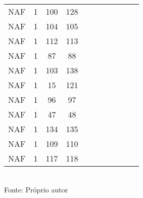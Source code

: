 \begin{table}[H]
{\begin{tabular}{ccccccccccc}
NAF & 1 & 100 & 128 &  &  &  &  &  &  &  \\
NAF & 1 & 104 & 105 &  &  &  &  &  &  &  \\
NAF & 1 & 112 & 113 &  &  &  &  &  &  &  \\
NAF & 1 & 87 & 88 &  &  &  &  &  &  &  \\
NAF & 1 & 103 & 138 &  &  &  &  &  &  &  \\
NAF & 1 & 15 & 121 &  &  &  &  &  &  &  \\
NAF & 1 & 96 & 97 &  &  &  &  &  &  &  \\
NAF & 1 & 47 & 48 &  &  &  &  &  &  &  \\
NAF & 1 & 134 & 135 &  &  &  &  &  &  &  \\
NAF & 1 & 109 & 110 &  &  &  &  &  &  &  \\
NAF & 1 & 117 & 118 &  &  &  &  &  &  &  \\
\bottomrule
\end{tabular}}
\\Fonte: Próprio autor
\end{table}


